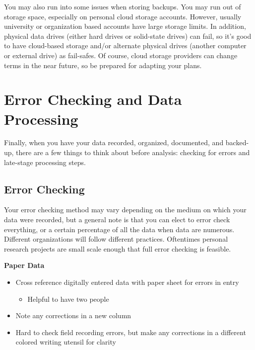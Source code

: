 \documentclass[
  letterpaper,
  DIV=11,
  numbers=noendperiod]{scrreprt}
\providecommand{\tightlist}{%
  \setlength{\itemsep}{0pt}\setlength{\parskip}{0pt}}\usepackage{longtable,booktabs,array}
\begin{document}
You may also run into some issues when storing backups. You may run out
of storage space, especially on personal cloud storage accounts.
However, usually university or organization based accounts have large
storage limits. In addition, physical data drives (either hard drives or
solid-state drives) can fail, so it's good to have cloud-based storage
and/or alternate physical drives (another computer or external drive) as
fail-safes. Of course, cloud storage providers can change terms in the
near future, so be prepared for adapting your plans.

\chapter{Error Checking and Data
Processing}\label{error-checking-and-data-processing}

Finally, when you have your data recorded, organized, documented, and
backed-up, there are a few things to think about before analysis:
checking for errors and late-stage processing steps.

\section{Error Checking}\label{error-checking}

Your error checking method may vary depending on the medium on which
your data were recorded, but a general note is that you can elect to
error check everything, or a certain percentage of all the data when
data are numerous. Different organizations will follow different
practices. Oftentimes personal research projects are small scale enough
that full error checking is feasible.

\textbf{Paper Data}

\begin{itemize}
\item
  Cross reference digitally entered data with paper sheet for errors in
  entry

  \begin{itemize}
  \tightlist
  \item
    Helpful to have two people
  \end{itemize}
\item
  Note any corrections in a new column
\item
  Hard to check field recording errors, but make any corrections in a
  different colored writing utensil for clarity
\end{itemize}
\end{document}
